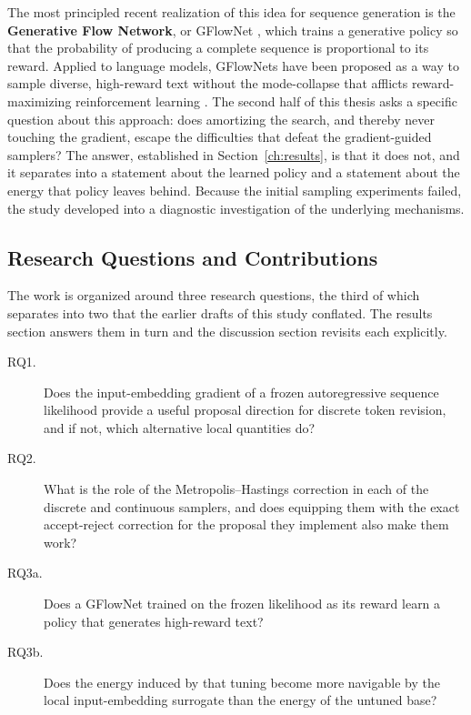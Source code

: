 The most principled recent realization of this idea for sequence generation is the \textbf{Generative Flow Network}, or GFlowNet \citep{bengio2021flow, bengio2023gflownet}, which trains a generative policy so that the probability of producing a complete sequence is proportional to its reward. Applied to language models, GFlowNets have been proposed as a way to sample diverse, high-reward text without the mode-collapse that afflicts reward-maximizing reinforcement learning \citep{hu2024amortizing}. The second half of this thesis asks a specific question about this approach: does amortizing the search, and thereby never touching the gradient, escape the difficulties that defeat the gradient-guided samplers? The answer, established in Section~\ref{ch:results}, is that it does not, and it separates into a statement about the learned policy and a statement about the energy that policy leaves behind. Because the initial sampling experiments failed, the study developed into a diagnostic investigation of the underlying mechanisms.

\subsection{Research Questions and Contributions}
\label{sec:intro-rqs}

The work is organized around three research questions, the third of which separates into two that the earlier drafts of this study conflated. The results section answers them in turn and the discussion section revisits each explicitly.

\begin{description}
    \item[RQ1.] Does the input-embedding gradient of a frozen autoregressive sequence likelihood provide a useful proposal direction for discrete token revision, and if not, which alternative local quantities do?
    \item[RQ2.] What is the role of the Metropolis--Hastings correction in each of the discrete and continuous samplers, and does equipping them with the exact accept-reject correction for the proposal they implement also make them work?
    \item[RQ3a.] Does a GFlowNet trained on the frozen likelihood as its reward learn a policy that generates high-reward text?
    \item[RQ3b.] Does the energy induced by that tuning become more navigable by the local input-embedding surrogate than the energy of the untuned base?
\end{description}

